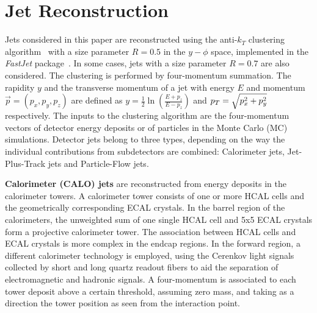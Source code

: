 \section{Jet Reconstruction}\label{sec:jets}

Jets considered in this paper are reconstructed using the anti-$k_T$ clustering algorithm~\cite{AKT} with a size parameter $R=0.5$ in the $y-\phi$ space, implemented in the \textit{FastJet} package~\cite{FASTJETI,FASTJETII}. In some cases, jets with a size parameter $R=0.7$ are also considered. The clustering is performed by four-momentum summation. The rapidity $y$ and the transverse momentum \pt of a jet with energy $E$ and momentum $\vec{p}=(p_x,p_y,p_z)$ are defined as $y=\frac{1}{2}\ln\left(\frac{E+p_z}{E-p_z}\right)$ and $p_{{T}}=\sqrt{p_x^2+p_y^2}$ respectively. The inputs to the clustering algorithm are the four-momentum vectors of detector energy deposits or of particles in the Monte Carlo (MC) simulations. Detector jets belong to three types, depending on the way the individual contributions from subdetectors are combined: Calorimeter jets, Jet-Plus-Track jets and Particle-Flow jets.  

{\bf Calorimeter (CALO) jets} are reconstructed from energy deposits in the calorimeter towers. A calorimeter tower consists of one or more HCAL cells and the geometrically corresponding ECAL crystals. In the barrel region of the calorimeters, the unweighted sum of one single HCAL cell and 5x5 ECAL crystals form a projective calorimeter tower. The association between HCAL cells and ECAL crystals is more complex in the endcap regions. In the forward region, a different calorimeter technology is employed, using the Cerenkov light signals collected by short and long quartz readout fibers to aid the separation of electromagnetic and hadronic signals. A four-momentum is associated to each tower deposit above a certain threshold, assuming zero mass, and taking as a direction the tower position as seen from the interaction point.

